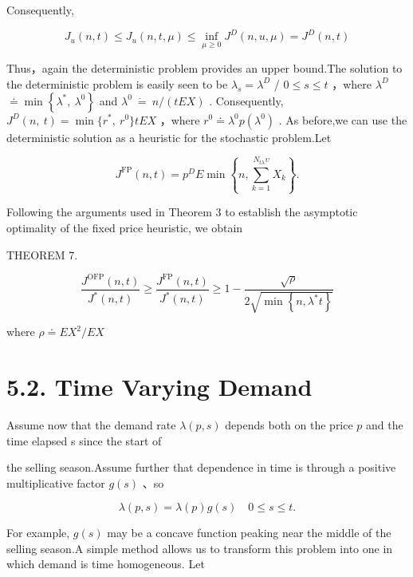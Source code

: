 Consequently,

\[
J _ { u } ( n , t ) \le J _ { u } ( n , t , \mu ) \le \operatorname * { i n f } _ { \mu \ge 0 } { J ^ { D } ( n , u , \mu ) } = J ^ { D } ( n , t )
\]

Thus，again the deterministic problem provides an upper bound.The
solution to the deterministic problem is easily seen to be
\(\lambda _ { s } = \lambda ^ { D }\) / \(0 \leq s \leq t\) ，where
\(\lambda ^ { D }\)
\(\doteq \operatorname* { m i n } \left\{ \lambda ^ { * } , \ \lambda ^ { 0 } \right\}\)
and \(\lambda ^ { 0 } \ \dot { = } \ n / ( t E X )\) . Consequently,
\(J ^ { D } ( n , \ t ) = \operatorname* { m i n } { \{ r ^ { * } , \ r ^ { 0 } \} } t E X\)
，where \(r ^ { 0 } \doteq \lambda ^ { 0 } p ( \lambda ^ { 0 } )\) . As
before,we can use the deterministic solution as a heuristic for the
stochastic problem.Let

\[
J ^ { \mathrm { F P } } ( n , t ) = p ^ { D } E \operatorname* { m i n } \left\{ n , \sum _ { k = 1 } ^ { N _ { t \lambda } \upsilon } X _ { k } \right\} .
\]

Following the arguments used in Theorem 3 to establish the asymptotic
optimality of the fixed price heuristic, we obtain

THEOREM 7.

\[
\frac { J ^ { \mathrm { O F P } } ( n , t ) } { J ^ { * } ( n , t ) } \geq \frac { J ^ { \mathrm { F P } } ( n , t ) } { J ^ { * } ( n , t ) } \geq 1 - \frac { \sqrt { \rho } } { 2 \sqrt { \operatorname* { m i n } \left\{ n , \lambda ^ { * } t \right\} } }
\]

where \(\rho \doteq E X ^ { 2 } / E X\)

\section{5.2. Time Varying Demand}\label{time-varying-demand}

Assume now that the demand rate \(\lambda ( p , s )\) depends both on
the price \(p\) and the time elapsed s since the start of

the selling season.Assume further that dependence in time is through a
positive multiplicative factor \(g ( s )\) 、so

\[
\lambda ( p , s ) = \lambda ( p ) g ( s ) \quad 0 \leq s \leq t .
\]

For example, \(g ( s )\) may be a concave function peaking near the
middle of the selling season.A simple method allows us to transform this
problem into one in which demand is time homogeneous. Let

